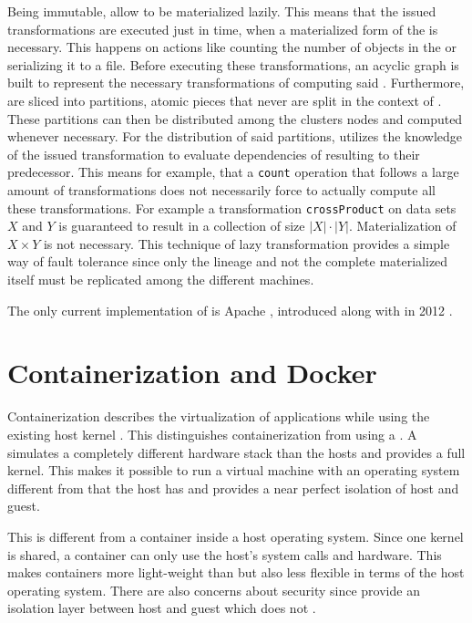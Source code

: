 Being immutable, \rdds{} allow to be materialized lazily. This means that the issued transformations are executed just in time, when a materialized form of the \rdd{} is necessary. This happens on actions like counting the number of objects in the \rdd{} or serializing it to a file. Before executing these transformations, an acyclic graph is built to represent the necessary transformations of computing said \rdd{}. Furthermore, \rdds{} are sliced into partitions, atomic pieces that never are split in the context of \spark{}. These partitions can then be distributed among the clusters nodes and computed whenever necessary. For the distribution of said partitions, \spark{} utilizes the knowledge of the issued transformation to evaluate dependencies of resulting \rdds{} to their predecessor. This means for example, that a \lstinline|count| operation that follows a large amount of transformations does not necessarily force \spark{} to actually compute all these transformations. For example a transformation \lstinline|crossProduct| on data sets $X$ and $Y$ is guaranteed to result in a collection of size $|X|\cdot{}|Y|$. Materialization of $X\times{}Y$ is not necessary. This technique of lazy transformation provides a simple way of fault tolerance since only the \rdd{} lineage and not the complete materialized \rdd{} itself must be replicated among the different machines.

The only current implementation of \rdds{} is Apache \spark{}, introduced along with \rdds{} in 2012 \cite{zaharia2012resilient}.

\section{Containerization and Docker}
Containerization describes the virtualization of applications while using the existing host kernel \cite{wiki:container}. This distinguishes containerization from using a \vm{}. A \vm{} simulates a completely different hardware stack than the hosts and provides a full kernel. This makes it possible to run a virtual machine with an operating system different from that the host has and provides a near perfect isolation of host and guest.

This is different from a container inside a host operating system. Since one kernel is shared, a container can only use the host's system calls and hardware. This makes containers more light-weight than \vms{} but also less flexible in terms of the host operating system. There are also concerns about security since \vms{} provide an isolation layer between host and guest which \docker{} does not \cite{turnbull2014docker,jian2017defense}.

